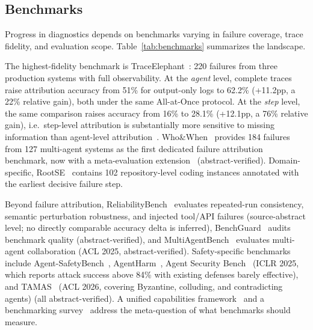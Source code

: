 \subsection{Benchmarks}\label{sec:diag_bench}

Progress in diagnostics depends on benchmarks varying in failure coverage, trace fidelity, and evaluation scope. Table~\ref{tab:benchmarks} summarizes the landscape.

The highest-fidelity benchmark is TraceElephant~\cite{traceelephant2026}: 220 failures from three production systems with full observability. At the \emph{agent} level, complete traces raise attribution accuracy from 51\% for output-only logs to 62.2\% (+11.2pp, a 22\% relative gain), both under the same All-at-Once protocol. At the \emph{step} level, the same comparison raises accuracy from 16\% to 28.1\% (+12.1pp, a 76\% relative gain), i.e.\ step-level attribution is substantially more sensitive to missing information than agent-level attribution~\cite{traceelephant2026}. Who\&When~\cite{whenwhen2025} provides 184 failures from 127 multi-agent systems as the first dedicated failure attribution benchmark, now with a meta-evaluation extension~\cite{whwhpro2026} (abstract-verified). Domain-specific, RootSE~\cite{trajaudit2026} contains 102 repository-level coding instances annotated with the earliest decisive failure step.

Beyond failure attribution, ReliabilityBench~\cite{reliabilitybench2026} evaluates repeated-run consistency, semantic perturbation robustness, and injected tool/API failures (source-abstract level; no directly comparable accuracy delta is inferred), BenchGuard~\cite{benchguard2026} audits benchmark quality (abstract-verified), and MultiAgentBench~\cite{multiagentbench2025} evaluates multi-agent collaboration (ACL 2025, abstract-verified). Safety-specific benchmarks include Agent-SafetyBench~\cite{agentsafetybench2024}, AgentHarm~\cite{agentharm2024}, Agent Security Bench~\cite{asb2025} (ICLR 2025, which reports attack success above 84\% with existing defenses barely effective), and TAMAS~\cite{tamas2026} (ACL 2026, covering Byzantine, colluding, and contradicting agents) (all abstract-verified). A unified capabilities framework~\cite{unifiedcapab2026} and a benchmarking survey~\cite{evalbenchmark2025} address the meta-question of what benchmarks should measure.

